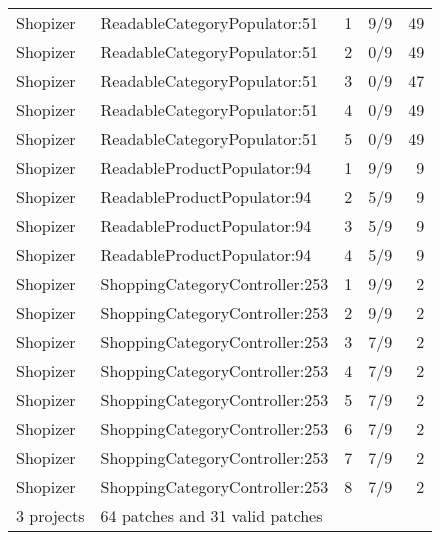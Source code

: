\begin{table}
{\begin{tabular}{|l|l|r|l|r|}
    Shopizer & ReadableCategoryPopulator:51 & 1 & 9/9 & 49 \\
    Shopizer & ReadableCategoryPopulator:51 & 2 & 0/9 & 49 \\
    Shopizer & ReadableCategoryPopulator:51 & 3 & 0/9 & 47 \\
    Shopizer & ReadableCategoryPopulator:51 & 4 & 0/9 & 49 \\
    Shopizer & ReadableCategoryPopulator:51 & 5 & 0/9 & 49 \\
    Shopizer & ReadableProductPopulator:94 & 1 & 9/9 & 9 \\
    Shopizer & ReadableProductPopulator:94 & 2 & 5/9 & 9 \\
    Shopizer & ReadableProductPopulator:94 & 3 & 5/9 & 9 \\
    Shopizer & ReadableProductPopulator:94 & 4 & 5/9 & 9 \\
    Shopizer & ShoppingCategoryController:253 & 1 & 9/9 & 2 \\
    Shopizer & ShoppingCategoryController:253 & 2 & 9/9 & 2 \\
    Shopizer & ShoppingCategoryController:253 & 3 & 7/9 & 2 \\
    Shopizer & ShoppingCategoryController:253 & 4 & 7/9 & 2 \\
    Shopizer & ShoppingCategoryController:253 & 5 & 7/9 & 2 \\
    Shopizer & ShoppingCategoryController:253 & 6 & 7/9 & 2 \\
    Shopizer & ShoppingCategoryController:253 & 7 & 7/9 & 2 \\
    Shopizer & ShoppingCategoryController:253 & 8 & 7/9 & 2 \\
    \hline
    3 projects & \multicolumn{4}{|l|}{64 patches and 31 valid patches} }}\\
    \hline
  \end{tabular}
  }
\end{table}